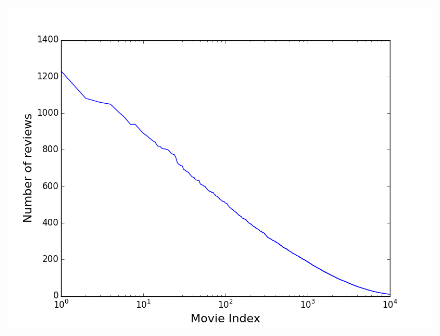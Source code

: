\documentclass{article}
\begin{document}
\begin{figure}
\begin{minipage}{.6\textwidth}
  \includegraphics[width=\linewidth]{NbReviewsPerMovie.png}
  \label{NbReviewsPerMovie}
\end{minipage}
\end{figure}
\end{document}

